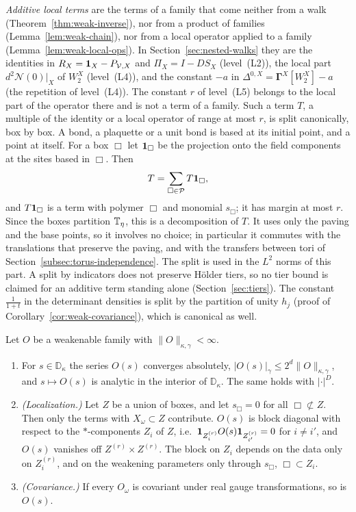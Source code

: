 \emph{Additive local terms} are the terms of a family that come neither from a walk (Theorem~\ref{thm:weak-inverse}), nor from a product of families (Lemma~\ref{lem:weak-chain}), nor from a local operator applied to a family (Lemma~\ref{lem:weak-local-ops}). In Section~\ref{sec:nested-walks} they are the identities in $R_X=\mathbf 1_X-P_{\mathcal V,X}$ and $\Pi_X=I-DS_X$ (level~(L2)), the local part $d^2\mathcal N(0)|_X$ of $W_2^X$ (level~(L4)), and the constant $-a$ in $\Delta^{0,X}=\boldsymbol\Gamma^X[W_2^X]-a$ (the repetition of level~(L4)). The constant $r$ of level~(L5) belongs to the local part of the operator there and is not a term of a family. Such a term $T$, a multiple of the identity or a local operator of range at most $r$, is split canonically, box by box. A bond, a plaquette or a unit bond is based at its initial point, and a point at itself. For a box $\Box$ let $\mathbf 1_\Box$ be the projection onto the field components at the sites based in $\Box$. Then
\[
T=\sum_{\Box\in\mathcal P}T\mathbf 1_\Box ,
\]
and $T\mathbf 1_\Box$ is a term with polymer $\Box$ and monomial $s_\Box$; it has margin at most $r$. Since the boxes partition $\mathbb T_\eta$, this is a decomposition of $T$. It uses only the paving and the base points, so it involves no choice; in particular it commutes with the translations that preserve the paving, and with the transfers between tori of Section~\ref{subsec:torus-independence}. The split is used in the $L^2$ norms of this part. A split by indicators does not preserve H\"older tiers, so no tier bound is claimed for an additive term standing alone (Section~\ref{sec:tiers}). The constant $\frac1{1+t}$ in the determinant densities is split by the partition of unity $h_j$ (proof of Corollary~\ref{cor:weak-covariance}), which is canonical as well.

\begin{lemma}\label{lem:weak-basic}
Let $O$ be a weakenable family with $\|O\|_{\kappa,\gamma}<\infty$.
\begin{enumerate}[label=(\alph*)]
\item For $s\in\mathbb D_\kappa$ the series $O(s)$ converges absolutely, $|O(s)|_\gamma\le2^d\|O\|_{\kappa,\gamma}$, and $s\mapsto O(s)$ is analytic in the interior of $\mathbb D_\kappa$. The same holds with $|\cdot|^D$.
\item \emph{(Localization.)} Let $Z$ be a union of boxes, and let $s_\Box=0$ for all $\Box\not\subset Z$. Then only the terms with $X_\omega\subset Z$ contribute. $O(s)$ is block diagonal with respect to the $*$-components $Z_i$ of $Z$, i.e.\ $\mathbf 1_{Z_i^{(r)}}O(s)\mathbf 1_{Z_{i'}^{(r)}}=0$ for $i\ne i'$, and $O(s)$ vanishes off $Z^{(r)}\times Z^{(r)}$. The block on $Z_i$ depends on the data only on $Z_i^{(r)}$, and on the weakening parameters only through $s_\Box$, $\Box\subset Z_i$.
\item \emph{(Covariance.)} If every $O_\omega$ is covariant under real gauge transformations, so is $O(s)$.
\end{enumerate}
\end{lemma}

